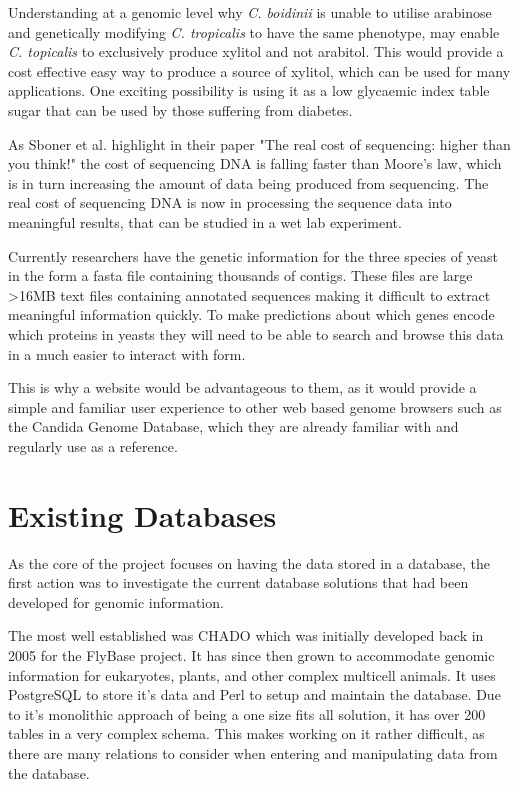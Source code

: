 Understanding at a genomic level why \textit{C. boidinii} is unable to utilise arabinose and genetically modifying \textit{C. tropicalis} to have the same phenotype, may enable \textit{C. topicalis} to exclusively produce xylitol and not arabitol. This would provide a cost effective easy way to produce a source of xylitol, which can be used for many applications. One exciting possibility is using it as a low glycaemic index table sugar that can be used by those suffering from diabetes.

As Sboner et al. highlight in their paper "The real cost of sequencing: higher than you think!"\cite{sequencingcost} the cost of sequencing DNA is falling faster than Moore's law, which is in turn increasing the amount of data being produced from sequencing. The real cost of sequencing DNA is now in processing the sequence data into meaningful results, that can be studied in a wet lab experiment. 

Currently researchers have the genetic information for the three species of yeast in the form a fasta file containing thousands of contigs. These files are large \textgreater 16MB text files containing annotated sequences making it difficult to extract meaningful information quickly. To make predictions about which genes encode which proteins in yeasts they will need to be able to search and browse this data in a much easier to interact with form. 

This is why a website would be advantageous to them, as it would provide a simple and familiar user experience to other web based genome browsers such as the Candida Genome Database\cite{cgd}, which they are already familiar with and regularly use as a reference. 

\section{Existing Databases}
As the core of the project focuses on having the data stored in a database, the first action was to investigate the current database solutions that had been developed for genomic information. 

The most well established was CHADO\cite{chado} which was initially developed back in 2005 for the FlyBase\cite{flybase} project. It has since then grown to accommodate genomic information for eukaryotes, plants, and other complex multicell animals. It uses PostgreSQL\cite{postgres} to store it's data and Perl\cite{perl} to setup and maintain the database. Due to it's monolithic approach of being a one size fits all solution, it has over 200 tables in a very complex schema. This makes working on it rather difficult, as there are many relations to consider when entering and manipulating data from the database.

